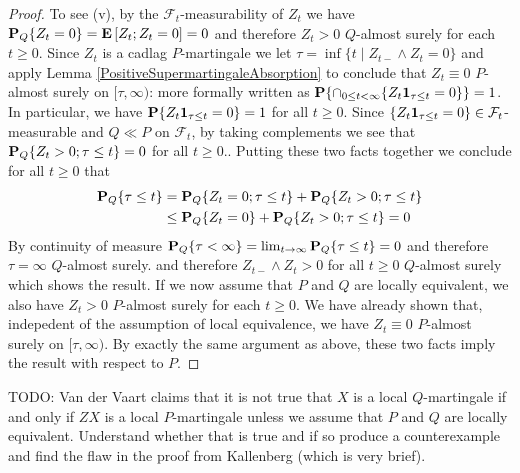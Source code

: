 \begin{proof}
To see (v), by the $\mathcal{F}_t$-measurability of $Z_t$ we have $\sprobability{Z_t = 0}{Q} = \expectation{Z_t ; Z_t = 0} = 0$ and therefore $Z_t > 0$ $Q$-almost surely for each $t \geq 0$.  Since $Z_t$ is a cadlag $P$-martingale we let $\tau = \inf \lbrace t \mid Z_{t-} \wedge Z_t = 0 \rbrace$ and apply Lemma \ref{PositiveSupermartingaleAbsorption} to conclude that $Z_t \equiv 0$ $P$-almost surely on $[\tau,\infty)$: more formally written as $\probability{\cap_{0 \leq t < \infty} \lbrace Z_t \characteristic{\tau \leq t} = 0 \rbrace}=1$.  In particular, we have $\probability{Z_t \characteristic{\tau \leq t} = 0}=1$ for all $t \geq 0$.  Since $\lbrace Z_t \characteristic{\tau \leq t} = 0\rbrace \in \mathcal{F}_{t}$-measurable and  $Q \ll P$ on $\mathcal{F}_{t}$, by taking complements we see that $\sprobability{Z_t > 0 ; \tau \leq t}{Q}=0$ for all $t \geq 0$..  Putting these two facts together we conclude for all $t \geq 0$ that
\begin{align*}
\sprobability{\tau \leq t}{Q} &= \sprobability{Z_t = 0 ; \tau \leq t}{Q} + \sprobability{Z_t > 0 ; \tau \leq t}{Q}  \\
&\leq \sprobability{Z_t = 0}{Q} + \sprobability{Z_t > 0 ; \tau \leq t}{Q}  = 0
\end{align*}
By continuity of measure $\sprobability{\tau < \infty}{Q} = \lim_{t \to \infty} \sprobability{\tau \leq t}{Q} = 0$ and therefore
$\tau = \infty$ $Q$-almost surely. and therefore $Z_{t-} \wedge Z_t > 0$ for all $t \geq 0$ $Q$-almost surely which shows the result.  If we now assume that $P$ and $Q$ are locally equivalent, we also have $Z_t > 0$ $P$-almost surely for each $t \geq 0$.  We have already shown that, indepedent of the assumption of local equivalence, we have $Z_t \equiv 0$ $P$-almost surely on $[\tau,\infty)$.  By exactly the same argument as above, these two facts imply the result with respect to $P$.
\end{proof}

TODO: Van der Vaart claims that it is not true that $X$ is a local $Q$-martingale if and only if $ZX$ is a local $P$-martingale unless we assume that $P$ and $Q$ are locally equivalent.  Understand whether that is true and if so produce a counterexample and find the flaw in the proof from Kallenberg (which is very brief).

